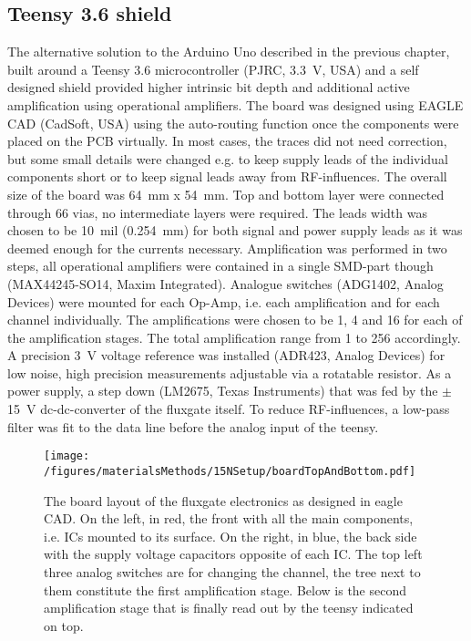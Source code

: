         \subsection{Teensy 3.6 shield}
        \label{sec:matMeth:teensyShield}
        The alternative solution to the Arduino Uno described in the previous chapter, built around a Teensy 3.6 microcontroller (PJRC, \SI{3.3}{\volt}, USA) and a self designed shield provided higher intrinsic bit depth and additional active amplification using operational amplifiers.  The board was designed using EAGLE CAD (CadSoft, USA) using the auto-routing function once the components were placed on the PCB virtually.  In most cases, the traces did not need correction, but some small details were changed e.g. to keep supply leads of the individual components short or to keep signal leads away from RF-influences.  The overall size of the board was \SI{64}{\mm} x \SI{54}{\mm}.  Top and bottom layer were connected through 66 vias, no intermediate layers were required.  The leads width was chosen to be \SI{10}{mil} (\SI{0.254}{\mm}) for both signal and power supply leads as it was deemed enough for the currents necessary. 
            Amplification was performed in two steps, all operational amplifiers were contained in a single SMD-part though (MAX44245-SO14, Maxim Integrated). Analogue switches (ADG1402, Analog Devices) were mounted for each Op-Amp, i.e. each amplification and for each channel individually. The amplifications were chosen to be 1, 4 and 16 for each of the amplification stages. The total amplification range from 1 to 256 accordingly. A precision \SI{3}{\volt} voltage reference was installed (ADR423, Analog Devices) for low noise, high precision measurements adjustable via a rotatable resistor. As a power supply, a step down (LM2675, Texas Instruments) that was fed by the $\pm$\SI{15}{\volt} dc-dc-converter of the fluxgate itself. To reduce RF-influences, a low-pass filter was fit to the data line before the analog input of the teensy. 
            \begin{figure}
                \texttt{[image: /figures/materialsMethods/15NSetup/boardTopAndBottom.pdf]}
                \caption[Fluxgate board layout]{The board layout of the fluxgate electronics as designed in eagle CAD. On the left, in red, the front with all the main components, i.e. ICs mounted to its surface. On the right, in blue, the back side with the supply voltage capacitors opposite of each IC. The top left three analog switches are for changing the channel, the tree next to them constitute the first amplification stage. Below is the second amplification stage that is finally read out by the teensy indicated on top.}
                \label{fig:materialsMethods:fluxgateBoard}
            \end{figure}
